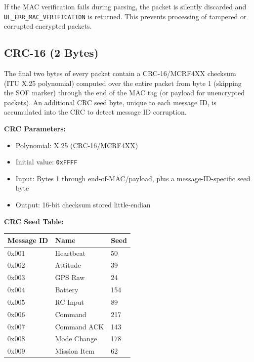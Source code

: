 \documentclass[11pt,a4paper]{article}
\begin{document}
\begin{alertbox}
If the MAC verification fails during parsing, the packet is silently discarded and \texttt{UL\_ERR\_MAC\_VERIFICATION} is returned. This prevents processing of tampered or corrupted encrypted packets.
\end{alertbox}

\subsection{CRC-16 (2 Bytes)}

The final two bytes of every packet contain a CRC-16/MCRF4XX checksum (ITU X.25 polynomial) computed over the entire packet from byte 1 (skipping the SOF marker) through the end of the MAC tag (or payload for unencrypted packets). An additional CRC seed byte, unique to each message ID, is accumulated into the CRC to detect message ID corruption.

\textbf{CRC Parameters:}
\begin{itemize}[noitemsep]
    \item Polynomial: X.25 (CRC-16/MCRF4XX)
    \item Initial value: \texttt{0xFFFF}
    \item Input: Bytes 1 through end-of-MAC/payload, plus a message-ID-specific seed byte
    \item Output: 16-bit checksum stored little-endian
\end{itemize}

\textbf{CRC Seed Table:}
\begin{table}[H]
\centering
\begin{tabular}{@{}lll@{}}
\toprule
\textbf{Message ID} & \textbf{Name} & \textbf{Seed} \\
\midrule
0x001 & Heartbeat & 50 \\
0x002 & Attitude  & 39 \\
0x003 & GPS Raw   & 24 \\
0x004 & Battery   & 154 \\
0x005 & RC Input  & 89 \\
0x006 & Command   & 217 \\
0x007 & Command ACK & 143 \\
0x008 & Mode Change & 178 \\
0x009 & Mission Item & 62 \\
\bottomrule
\end{tabular}
\end{table}

\end{document}
